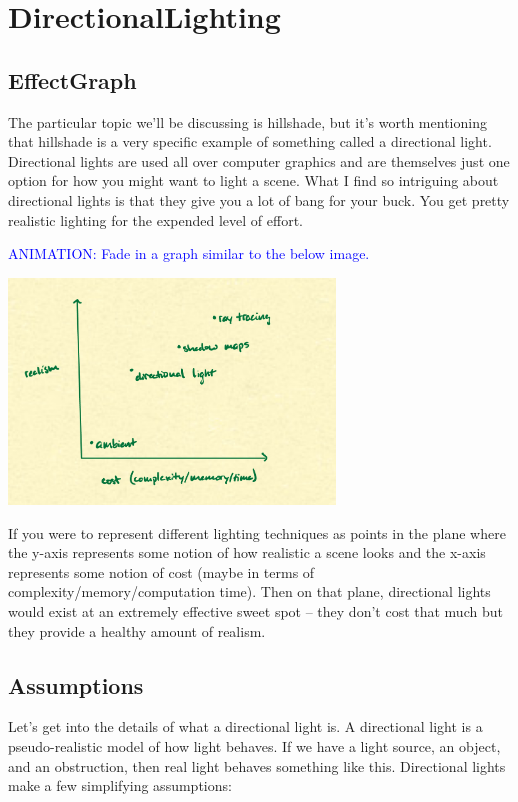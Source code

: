 \documentclass{article}
\newcommand\animation[1]{\textcolor{blue}{ANIMATION: #1}}
\begin{document}
\section{DirectionalLighting}

\subsection{EffectGraph}

The particular topic we'll be discussing is hillshade, but it's worth mentioning that hillshade is a very specific example of something called a directional light.
Directional lights are used all over computer graphics and are themselves just one option for how you might want to light a scene.
What I find so intriguing about directional lights is that they give you a lot of bang for your buck.
You get pretty realistic lighting for the expended level of effort.

\animation{Fade in a graph similar to the below image.}

\begin{center}
	\includegraphics[width=0.65\textwidth,frame]{assets/realism.jpg}
\end{center}

If you were to represent different lighting techniques as points in the plane where the y-axis represents some notion of how realistic a scene looks and the x-axis represents some notion of cost (maybe in terms of complexity/memory/computation time).
Then on that plane, directional lights would exist at an extremely effective sweet spot -- they don't cost that much but they provide a healthy amount of realism.

\subsection{Assumptions}

Let's get into the details of what a directional light is.
A directional light is a pseudo-realistic model of how light behaves.
If we have a light source, an object, and an obstruction, then real light behaves something like this.
Directional lights make a few simplifying assumptions:
\end{document}

